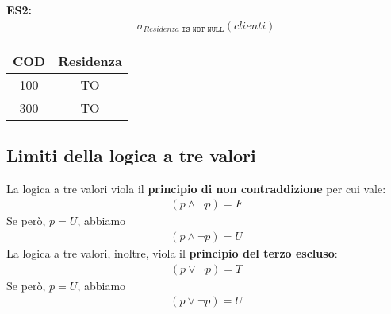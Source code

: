 \textbf{ES2:}
    \begin{equation}\begin{aligned}
        \sigma_{Residenza \texttt{ IS NOT NULL}} (clienti)
    \end{aligned}\end{equation}
    \begin{center}\begin{tabular}{|c|c|} \hline
        \textbf{COD} & \textbf{Residenza} \\ \hline
        100 & TO \\ \hline
        300 & TO \\ \hline
    \end{tabular}\end{center}

\subsection{Limiti della logica a tre valori}
La logica a tre valori viola il \textbf{principio di non contraddizione} per cui vale:
    \begin{equation}\begin{aligned}
        (p \wedge \neg p) = F 
    \end{aligned}\end{equation}
Se però, $p = U$, abbiamo 
    \begin{equation}\begin{aligned}
        (p \wedge \neg p) = U
    \end{aligned}\end{equation}
La logica a tre valori, inoltre, viola il \textbf{principio del terzo escluso}:
    \begin{equation}\begin{aligned}
        (p \vee \neg p) = T
    \end{aligned}\end{equation}
Se però, $p = U$, abbiamo 
    \begin{equation}\begin{aligned}
        (p \vee \neg p) = U
    \end{aligned}\end{equation}

